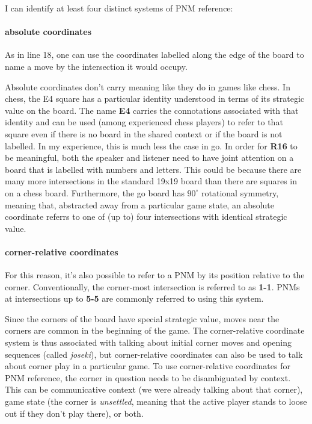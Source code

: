 \documentclass{scrartcl}
\begin{document}
\noindent I can identify at least four distinct systems of PNM reference: 

\paragraph{absolute coordinates}

As in line 18, one can use the coordinates labelled along the edge of the board
to name a move by the intersection it would occupy.

Absolute coordinates don't carry meaning like they do in games like chess.
In chess, the E4 square has a particular identity understood in terms of its
strategic value on the board. 
The name \textbf{E4} carries the connotations associated with that identity
and can be used (among experienced chess players) to refer to that square
even if there is no board in the shared context or if the board is not labelled.
In my experience, this is much less the case in go. 
In order for \textbf{R16} to be meaningful, both the speaker and listener
need to have joint attention on a board that is labelled with numbers and letters.
This could be because there are many more intersections in the
standard 19x19 board than there are squares in on a chess board.
Furthermore, the go board has $90^\circ$ rotational symmetry,
meaning that, abstracted away from a particular game state, 
an absolute coordinate referrs to one of (up to) four intersections
with identical strategic value.

\paragraph{corner-relative coordinates}

For this reason, it's also possible to refer to a PNM by its position
relative to the corner.
Conventionally, the corner-most intersection is referred to as \textbf{1-1}.
PNMs at intersections up to \textbf{5-5} are commonly referred to using this system.

Since the corners of the board have special strategic value,
moves near the corners are common in the beginning of the game.
The corner-relative coordinate system is thus associated with
talking about initial corner moves and opening sequences (called \textit{joseki}),
but corner-relative coordinates can also be used to talk about corner play in a particular game.
To use corner-relative coordinates for PNM reference, 
the corner in question needs to be disambiguated by 
context.
This can be communicative context (we were already talking about that corner), 
game state (the corner is \emph{unsettled}, meaning that the active player 
stands to loose out if they don't play there), or both.
\end{document}
